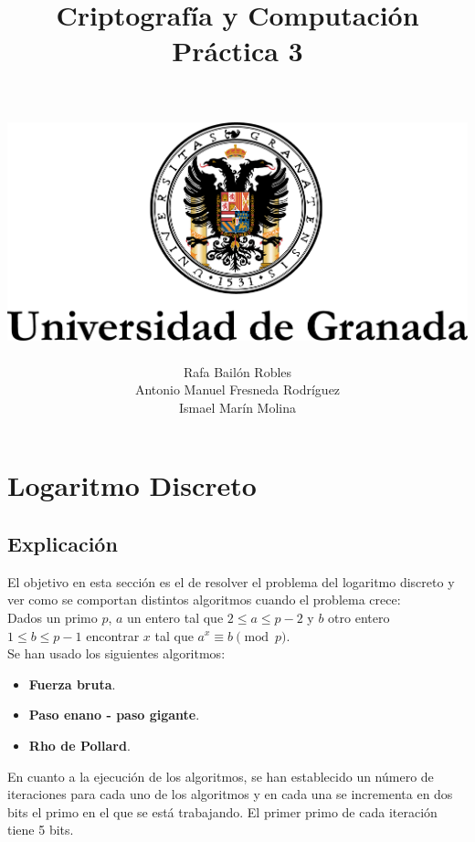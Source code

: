 \documentclass[12pt,spanish]{article}
\author{
		\\\\
		\includegraphics[scale=1]{UGR} \\
		\linebreak\\
		\Large Rafa Bailón Robles\\
		\Large Antonio Manuel Fresneda Rodríguez\\
		\Large Ismael Marín Molina\\
	}
\title{\huge \textbf{Criptografía y Computación\\ Práctica 3}}
\begin{document}
        \maketitle
        \pagebreak
        \tableofcontents
        \pagebreak
 	\section{Logaritmo Discreto}
	\subsection{Explicación}
	 	El objetivo en esta sección es el de resolver el problema del logaritmo discreto y ver como se comportan distintos algoritmos cuando el problema crece:\\
	 	Dados un primo $p$, $a$ un entero tal que $2 \leq a \leq p-2$ y $b$ otro entero $1 \leq b \leq p-1$ encontrar $x$ tal que $a^{x} \equiv b \pmod{p}$.\\
	 	Se han usado los siguientes algoritmos: 
	 	\begin{itemize}
	 		\item\textbf{Fuerza bruta}.
	 		\item\textbf{Paso enano - paso gigante}.
	 		\item\textbf{Rho de Pollard}.
	 	\end{itemize}
		En cuanto a la ejecución de los algoritmos, se han establecido un número de iteraciones para cada uno de los algoritmos y en cada una se incrementa en dos bits el primo en el que se está trabajando. El primer primo de cada iteración tiene 5 bits.
		\pagebreak
\end{document}
